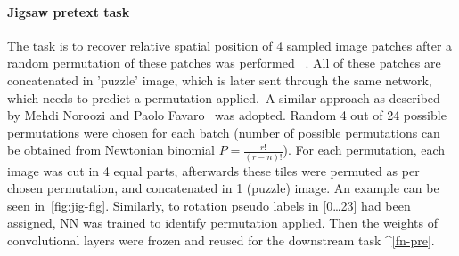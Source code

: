 \paragraph{Jigsaw pretext task}
The task is
to recover relative spatial position of 4 sampled image patches
after a random permutation of these patches was performed
~\cite{kolesnikov2019revisiting}.
All of these patches are concatenated in 'puzzle' image,
which is later sent through the same network, which needs to predict a permutation applied.\
A similar approach as described by Mehdi Noroozi and Paolo Favaro~\cite{DBLP:journals/corr/NorooziF16} was adopted.
Random 4 out of 24 possible permutations were chosen for each batch
(number of possible permutations can be obtained from Newtonian binomial $P=\frac{r!}{(r-n)!}$).
For each permutation, each image was cut in 4 equal parts,
afterwards these tiles were permuted as per chosen permutation, and concatenated in 1 (puzzle) image.
An example can be seen in~\ref{fig:jig-fig}.
Similarly, to rotation pseudo labels in [0\ldots23] had been assigned,
NN was trained to identify permutation applied.
Then the weights of convolutional layers were frozen and reused for the downstream task ^{\ref{fn-pre}}.

